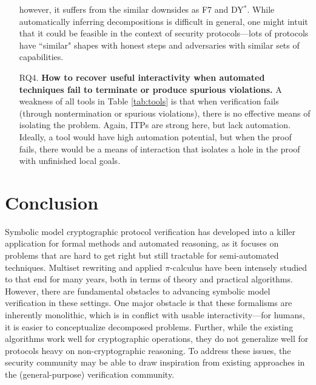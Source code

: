 \documentclass{article}
\theoremstyle{definition}
\begin{document}
\begin{itemize}
    however, it suffers from the similar downsides as F7 and DY$^*$.
    While automatically inferring decompositions is difficult in general, 
    one might intuit that it could be feasible in the context of security protocols---lots of protocols 
    have ``similar" shapes with honest steps and adversaries with similar sets of capabilities. 
    \item[\textsf{RQ4.}] \textbf{How to recover useful interactivity when automated techniques fail to terminate or produce spurious violations.} 
    A weakness of all tools in Table \ref{tab:tools} is that when verification fails (through nontermination or spurious violations), 
    there is no effective means of isolating the problem. 
    Again, ITPs are strong here, but lack automation.
    Ideally, a tool would have high automation potential, but when the proof fails, 
    there would be a means of interaction that isolates a hole in the proof with unfinished local goals. 
\end{itemize}

\section{Conclusion}

Symbolic model cryptographic protocol verification has developed into a killer application 
for formal methods and automated reasoning, as it focuses on problems that are hard to get right but still tractable for 
semi-automated techniques. Multiset rewriting and applied $\pi$-calculus have been intensely studied to that end for many years, 
both in terms of theory and practical algorithms. 
However, there are fundamental obstacles to advancing symbolic model verification in these settings. 
One major obstacle is that these formalisms are inherently monolithic, which is in conflict with usable 
interactivity---for humans, it is easier to conceptualize decomposed problems. 
Further, while the existing algorithms work well for cryptographic operations, 
they do not generalize well for protocols heavy on non-cryptographic reasoning. 
To address these issues, the security community may be able to draw inspiration 
from existing approaches in the (general-purpose) verification community.
\end{document}
